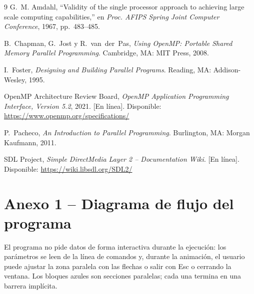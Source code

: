 \documentclass[11pt,letterpaper]{article}
\begin{document}
\begin{thebibliography}{9}
G.~M. Amdahl, ``Validity of the single processor approach to achieving large
scale computing capabilities,'' en \emph{Proc. AFIPS Spring Joint Computer
Conference}, 1967, pp.~483--485.

B.~Chapman, G.~Jost y R.~van~der~Pas, \emph{Using OpenMP: Portable Shared
Memory Parallel Programming}. Cambridge, MA: MIT Press, 2008.

I.~Foster, \emph{Designing and Building Parallel Programs}. Reading, MA:
Addison-Wesley, 1995.

OpenMP Architecture Review Board, \emph{OpenMP Application Programming
Interface, Version 5.2}, 2021. [En línea]. Disponible:
\url{https://www.openmp.org/specifications/}

P.~Pacheco, \emph{An Introduction to Parallel Programming}. Burlington, MA:
Morgan Kaufmann, 2011.

SDL Project, \emph{Simple DirectMedia Layer 2 -- Documentation Wiki}. [En
línea]. Disponible: \url{https://wiki.libsdl.org/SDL2/}
\end{thebibliography}

\newpage
\appendix
\section{Anexo 1 -- Diagrama de flujo del programa}

El programa no pide datos de forma interactiva durante la ejecución: los
parámetros se leen de la línea de comandos y, durante la animación, el usuario
puede ajustar la zona paralela con las flechas o salir con Esc o cerrando la
ventana. Los bloques azules son secciones paralelas; cada una termina en una
barrera implícita.
\end{document}
